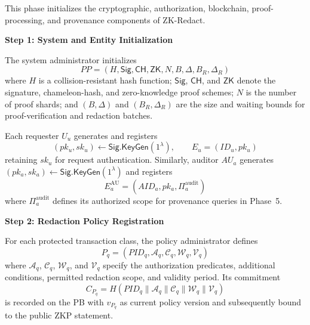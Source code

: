 \documentclass[lettersize,journal]{IEEEtran}
\begin{document}
This phase initializes the cryptographic, authorization, blockchain,
proof-processing, and provenance components of ZK-Redact.

\noindent\textbf{Step 1: System and Entity Initialization}

The system administrator initializes
\begin{equation}
PP=(H,\mathsf{Sig},\mathsf{CH},\mathsf{ZK},
N,B,\Delta,B_R,\Delta_R)
\label{eq:pp}
\end{equation}
where $H$ is a collision-resistant hash function; $\mathsf{Sig}$,
$\mathsf{CH}$, and $\mathsf{ZK}$ denote the signature, chameleon-hash,
and zero-knowledge proof schemes; $N$ is the number of proof shards;
and $(B,\Delta)$ and $(B_R,\Delta_R)$ are the size and waiting bounds
for proof-verification and redaction batches.

Each requester $U_u$ generates and registers
\begin{equation}
(pk_u,sk_u)\leftarrow\mathsf{Sig.KeyGen}(1^\lambda),
\qquad
E_u=(ID_u,pk_u)
\label{eq:user-keygen}
\end{equation}
retaining $sk_u$ for request authentication. Similarly, auditor $AU_a$
generates $(pk_a,sk_a)\leftarrow\mathsf{Sig.KeyGen}(1^\lambda)$ and
registers
\begin{equation}
E_a^{\mathrm{AU}}
=
(AID_a,pk_a,\Pi_a^{\mathrm{audit}})
\label{eq:auditor-registration}
\end{equation}
where $\Pi_a^{\mathrm{audit}}$ defines its authorized scope for
provenance queries in Phase~5.

\noindent\textbf{Step 2: Redaction Policy Registration}

For each protected transaction class, the policy administrator defines
\begin{equation}
P_q=
(PID_q,\mathcal{A}_q,\mathcal{C}_q,
\mathcal{W}_q,\mathcal{V}_q)
\label{eq:redaction-policy}
\end{equation}
where $\mathcal{A}_q$, $\mathcal{C}_q$, $\mathcal{W}_q$, and
$\mathcal{V}_q$ specify the authorization predicates, additional
conditions, permitted redaction scope, and validity period. Its
commitment
\begin{equation}
C_{P_q}
=
H\!\left(
PID_q\parallel\mathcal{A}_q\parallel\mathcal{C}_q
\parallel\mathcal{W}_q\parallel\mathcal{V}_q
\right)
\label{eq:policy-commitment}
\end{equation}
is recorded on the PB with $v_{P_q}$ as current policy version and subsequently bound to the public ZKP
statement.
\end{document}
